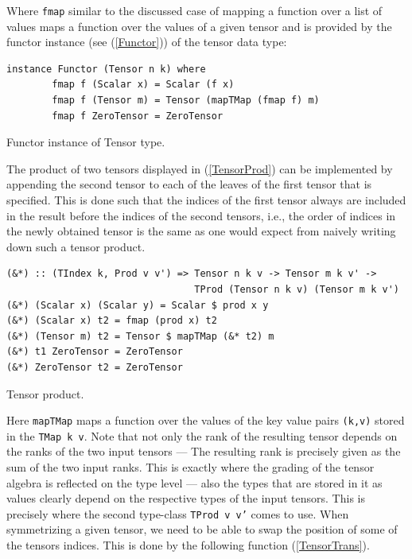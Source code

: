\documentclass[a4paper,12pt, DIV=14, BCOR=5mm, twoside, headsepline, numbers=noenddot]{scrbook}
\begin{document}
Where \texttt{fmap} similar to the discussed case of mapping a function over a list of values maps a function over the values of a given tensor and is provided by the functor instance (see (\ref{Functor})) of the tensor data type:

\begin{listing}[hbt!] 
\begin{verbatim}
instance Functor (Tensor n k) where 
        fmap f (Scalar x) = Scalar (f x)
        fmap f (Tensor m) = Tensor (mapTMap (fmap f) m)
        fmap f ZeroTensor = ZeroTensor 
\end{verbatim}
\caption{Functor instance of Tensor type.}\label{Functor}
\end{listing}

The product of two tensors displayed in (\ref{TensorProd}) can be implemented by appending the second tensor to each of the leaves of the first tensor that is specified. This is done such that the indices of the first tensor always are included in the result before the indices of the second tensors, i.e., the order of indices in the newly obtained tensor is the same as one would expect from naively writing down such a tensor product.

\begin{listing}[hbt!]
\begin{verbatim}
(&*) :: (TIndex k, Prod v v') => Tensor n k v -> Tensor m k v' ->
                                 TProd (Tensor n k v) (Tensor m k v')
(&*) (Scalar x) (Scalar y) = Scalar $ prod x y
(&*) (Scalar x) t2 = fmap (prod x) t2
(&*) (Tensor m) t2 = Tensor $ mapTMap (&* t2) m
(&*) t1 ZeroTensor = ZeroTensor
(&*) ZeroTensor t2 = ZeroTensor
\end{verbatim}
\caption{Tensor product.}\label{TensorProd}
\end{listing}

Here \texttt{mapTMap} maps a function over the values of the key value pairs \texttt{(k,v)} stored in the \texttt{TMap k v}.
Note that not only the rank of the resulting tensor depends on the ranks of the two input tensors --- The resulting rank is precisely given as the sum of the two input ranks. This is exactly where the grading of the tensor algebra is reflected on the type level --- also the types that are stored in it as values clearly depend on the respective types of the input tensors. This is precisely where the second type-class \texttt{TProd v v'} comes to use. 
When symmetrizing a given tensor, we need to be able to swap the position of some of the tensors indices. This is done by the following function (\ref{TensorTrans}).
\end{document}
